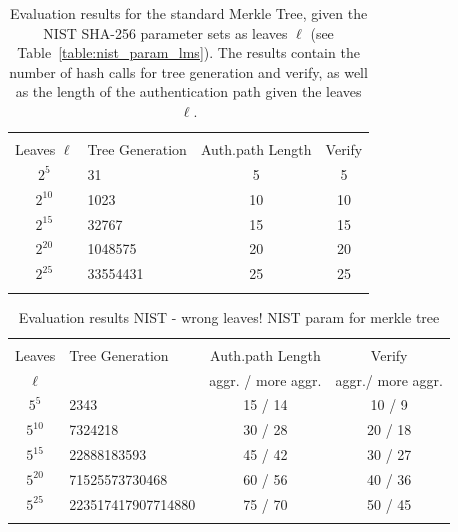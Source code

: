 \begin{table}
\centering
\begin{tabular}{c l c c} 
 \hline\noalign{\smallskip}
 \multicolumn{4}{c}{\textbf{Evaluation Results NIST: Merkle Tree}} \\
 \noalign{\smallskip} 
  Leaves $\ell$ & Tree Generation & Auth.path Length & Verify \\
 \hline\noalign{\smallskip}
 $2^5$ & 31 & 5 & 5 \\
 $2^{10}$ & 1023 & 10 & 10 \\
 $2^{15}$ & 32767 & 15 & 15 \\ 
 $2^{20}$ & 1048575 & 20 & 20 \\ 
 $2^{25}$ & 33554431 & 25 & 25 \\ 
 \hline\noalign{\smallskip}
 \end{tabular}
\caption{Evaluation results for the standard Merkle Tree, given the NIST SHA-256 parameter sets as leaves $\ell$ (see Table~\ref{table:nist_param_lms}). The results contain the number of hash calls for tree generation and verify, as well as the length of the authentication path given the leaves $\ell$.}
\label{table:eval_merkle_tree_NIST}
\end{table}

\begin{table}
\centering
\begin{tabular}{c l c c} 
 \hline\noalign{\smallskip}
 \multicolumn{4}{c}{\textbf{Evaluation Results NIST: \tftree\xspace/ \extree}} \\
 \noalign{\smallskip} 
  Leaves & Tree Generation & Auth.path Length & Verify \\
 $\ell$ & & aggr. / more aggr. & aggr./ more aggr. \\
 \hline\noalign{\smallskip}
 $5^5$ & 2343 & 15 / 14 & 10 / 9 \\
 $5^{10}$ & 7324218 & 30 / 28 & 20 / 18 \\
 $5^{15}$ & 22888183593 & 45 / 42 & 30 / 27 \\ 
 $5^{20}$ & 71525573730468 & 60 / 56 & 40 / 36 \\ 
 $5^{25}$ & 223517417907714880 & 75 / 70 & 50 / 45 \\ 
 \hline\noalign{\smallskip}
 \end{tabular}
\caption{Evaluation results NIST - wrong leaves! NIST param for merkle tree}
\label{table:eval_t5_NIST}
\end{table}

